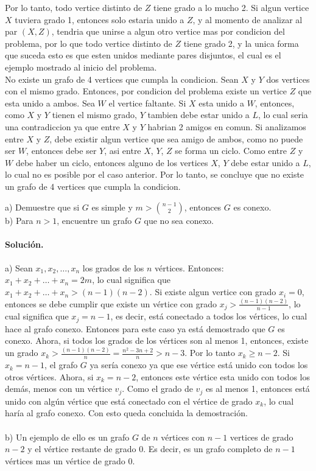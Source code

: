 \documentclass[12pt]{article}
\newenvironment{ejercicio}[2][Ejercicio]{\begin{trivlist}
\item[\hskip \labelsep {\bfseries #1}\hskip \labelsep {\bfseries #2.}]}{\end{trivlist}}
\begin{document}
Por lo tanto, todo vertice distinto de $Z$ tiene grado a lo mucho 2. Si algun vertice $X$ tuviera grado 1, entonces solo estaria unido a $Z$, y al momento de analizar al par $(X,Z)$, tendria que unirse a algun otro vertice mas por condicion del problema, por lo que todo vertice distinto de $Z$ tiene grado 2, y la unica forma que suceda esto es que esten unidos mediante pares disjuntos, el cual es el ejemplo mostrado al inicio del problema.
\\
No existe un grafo de 4 vertices que cumpla la condicion. Sean $X$ y $Y$ dos vertices con el mismo grado. Entonces, por condicion del problema existe un vertice $Z$ que esta unido a ambos.
Sea $W$ el vertice faltante. Si $X$ esta unido a $W$, entonces, como $X$ y $Y$ tienen el mismo grado, $Y$ tambien debe estar unido a $L$, lo cual seria una contradiccion ya que entre $X$ y $Y$ habrian 2 amigos en comun. Si analizamos entre $X$ y $Z$, debe existir algun vertice que sea amigo de ambos, como no puede ser $W$, entonces debe ser $Y$, asi entre $X$, $Y$, $Z$ se forma un ciclo. Como entre $Z$ y $W$ debe haber un ciclo, entonces alguno de los vertices $X$, $Y$ debe estar unido a $L$, lo cual no es posible por el caso anterior. Por lo tanto, se concluye que no existe un grafo de 4 vertices que cumpla la condicion.

\begin{ejercicio}{1.1.12}
\end{ejercicio}
a) Demuestre que si $G$ es simple y $ m > \binom{n-1}{2}$, entonces $G$ es conexo.
\\
b) Para $n > 1$, encuentre un grafo $G$ que no sea conexo.
\\\\
\textbf{Solución.} 
\\\\
a) Sean $x_1, x_2, \ldots, x_n$ los grados de los $n$ vértices. Entonces:
$x_1 + x_2 + \ldots + x_n = 2m$, lo cual significa que $x_1 + x_2 + \ldots + x_n > (n-1)(n-2) $. Si existe algun vertice con grado $x_i = 0$, entonces se debe cumplir que existe un vértice con grado $x_j > \frac{(n-1)(n-2)}{n-1}$, lo cual significa que $x_j = n-1$, es decir, está conectado a todos los vértices, lo cual hace al grafo conexo. Entonces para este caso ya está demostrado que $G$ es conexo. Ahora, si todos los grados de los vértices son al menos 1, entonces, existe un grado $x_k > \frac{(n-1)(n-2)}{n} = \frac{n^2 - 3n + 2}{n} > n-3 $. Por lo tanto $ x_k \geq n-2 $. Si $x_k = n-1$, el grafo $G$ ya sería conexo ya que ese vértice está unido con todos los otros vértices. Ahora, si $x_k = n-2$, entonces este vértice esta unido con todos los demás, menos con un vértice $v_j$. Como el grado de $v_j$ es al menos 1, entonces está unido con algún vértice que está conectado con el vértice de grado $x_k$, lo cual haría al grafo conexo. Con esto queda concluida la demostración.
\\\\
b) Un ejemplo de ello es un grafo $G$ de $n$ vértices con $n-1$ vertices de grado $n-2$ y el vértice restante de grado 0. Es decir, es un grafo completo de $n-1$ vértices mas un vértice de grado 0.
\end{document}
